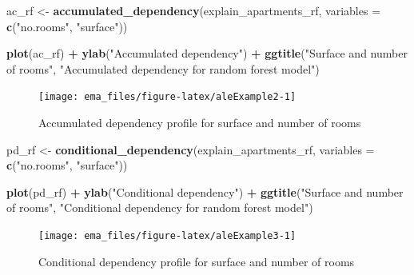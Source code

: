 \documentclass[12pt,]{krantz}
\newenvironment{Shaded}{\begin{snugshade}}{\end{snugshade}}
\newcommand{\DataTypeTok}[1]{\textcolor[rgb]{0.13,0.29,0.53}{#1}}
\newcommand{\KeywordTok}[1]{\textcolor[rgb]{0.13,0.29,0.53}{\textbf{#1}}}
\newcommand{\NormalTok}[1]{#1}
\newcommand{\OperatorTok}[1]{\textcolor[rgb]{0.81,0.36,0.00}{\textbf{#1}}}
\newcommand{\StringTok}[1]{\textcolor[rgb]{0.31,0.60,0.02}{#1}}
\begin{document}
\begin{Shaded}
\begin{Highlighting}[]
\NormalTok{ac_rf <-}\StringTok{ }\KeywordTok{accumulated_dependency}\NormalTok{(explain_apartments_rf, }\DataTypeTok{variables =} \KeywordTok{c}\NormalTok{(}\StringTok{"no.rooms"}\NormalTok{, }\StringTok{"surface"}\NormalTok{))}

\KeywordTok{plot}\NormalTok{(ac_rf) }\OperatorTok{+}\StringTok{ }\KeywordTok{ylab}\NormalTok{(}\StringTok{"Accumulated dependency"}\NormalTok{) }\OperatorTok{+}
\StringTok{  }\KeywordTok{ggtitle}\NormalTok{(}\StringTok{"Surface and number of rooms"}\NormalTok{, }\StringTok{"Accumulated dependency for random forest model"}\NormalTok{) }
\end{Highlighting}
\end{Shaded}

\begin{figure}

{\centering \texttt{[image: ema\_files/figure-latex/aleExample2-1]} 

}

\caption{Accumulated dependency profile for surface and number of rooms}\label{fig:aleExample2}
\end{figure}

\begin{Shaded}
\begin{Highlighting}[]
\NormalTok{pd_rf <-}\StringTok{ }\KeywordTok{conditional_dependency}\NormalTok{(explain_apartments_rf, }\DataTypeTok{variables =} \KeywordTok{c}\NormalTok{(}\StringTok{"no.rooms"}\NormalTok{, }\StringTok{"surface"}\NormalTok{))}

\KeywordTok{plot}\NormalTok{(pd_rf) }\OperatorTok{+}\StringTok{ }\KeywordTok{ylab}\NormalTok{(}\StringTok{"Conditional dependency"}\NormalTok{) }\OperatorTok{+}
\StringTok{  }\KeywordTok{ggtitle}\NormalTok{(}\StringTok{"Surface and number of rooms"}\NormalTok{, }\StringTok{"Conditional dependency for random forest model"}\NormalTok{) }
\end{Highlighting}
\end{Shaded}

\begin{figure}

{\centering \texttt{[image: ema\_files/figure-latex/aleExample3-1]} 

}

\caption{Conditional dependency profile for surface and number of rooms}\label{fig:aleExample3}
\end{figure}
\end{document}
